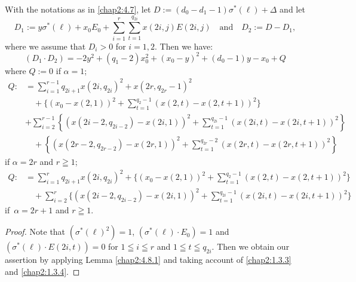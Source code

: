 \subsubsection{}\label{chap2:4.8.2}
\begin{lemma*}
  With the notations as in \ref{chap2:4.7}, let
  $D:=(d_{0}-d_{1}-1)\sigma^{\ast}(\ell)+\Delta$ and let
  $$
  D_{1}:=y\sigma^{\ast}(\ell)+x_{0}E_{0}+\sum^{r}_{i=1}
  \sum^{q_{2i}}_{t=1}x(2i,j) E(2i,j)\quad\text{and}\quad D_{2}:=D-D_{1}, 
  $$
  where we assume that $D_{i}>0$ for $i=1,2$. Then we have:
  $$
  (D_{1}\cdot
  D_{2})=-2y^{2}+(q_{1}-2)x^{2}_{0}+(x_{0}-y)^{2}+(d_{0}-1)y-x_{0}+Q 
  $$
  where $Q:=0$ if $\alpha=1$;
  \begin{align*}
    Q: &= \sum^{r-1}_{i=1}q_{2i+1}x(2i,q_{2i})^{2}+x(2r,q_{2r}-1)^{2}\\
    &\quad +\{(x_{0}-x(2,1))^{2}+\sum^{q_{2}-1}_{t=1}(x(2,t)-x(2,t+1))^{2}\}\\
    & + \sum^{r-1}_{i=2}\left\{(x(2i-2,q_{2i-2})-x(2i,1))^{2} +
    \sum^{q_{2i}-1}_{t=1}(x(2i,t)-x(2i,t+1))^{2}\right\}\\ 
    &\quad + \left\{(x(2r-2,q_{2r-2})-x(2r,1))^{2} + \sum^{q_{2r}-2}_{t=1}
    (x(2r,t)-x(2r,t+1))^{2}\right\}  
  \end{align*}
  if $\alpha=2r$ and $r\geqq 1$;
  \begin{align*}
    Q: &=\sum^{r}_{i=1}q_{2i+1}x(2i,q_{2i})^{2}+\{(x_{0}-x(2,1))^{2}+
    \sum^{q_{2}-1}_{t=1}(x(2,t)-x(2,t+1))^{2}\}\\  
    &\quad +\sum^{r}_{i=2}\{(x(2i-2,q_{2i-2})-x(2i,1))^{2}+
    \sum^{q_{2i}-1}_{t=1}(x(2i,t)-x(2i,t+1))^{2}\}  
  \end{align*}
  if\pageoriginale\ $\alpha=2r+1$ and $r\geqq 1$.
\end{lemma*}

\begin{proof}
  Note that $(\sigma^{\ast}(\ell)^{2})=1$, $(\sigma^{\ast}(\ell)\cdot
  E_{0})=1$ and $(\sigma^{\ast}(\ell)\cdot E(2i,t))=0$ for $1\leqq
  i\leqq r$ and $1\leqq t\leqq q_{2i}$. Then we obtain our assertion by
  applying Lemma \ref{chap2:4.8.1} and taking account of \ref{chap2:1.3.3} and
  \ref{chap2:1.3.4}.
\end{proof}

